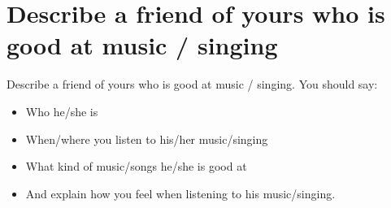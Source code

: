 \section{Describe a friend of yours who is good at music / singing}
\begin{ieltsprompt}
Describe a friend of yours who is good at music / singing.
You should say:
\begin{itemize}[leftmargin=2em, itemsep=2pt]
\item Who he/she is
\item When/where you listen to his/her music/singing
\item What kind of music/songs he/she is good at
\item And explain how you feel when listening to his music/singing.
\end{itemize}
\end{ieltsprompt}
